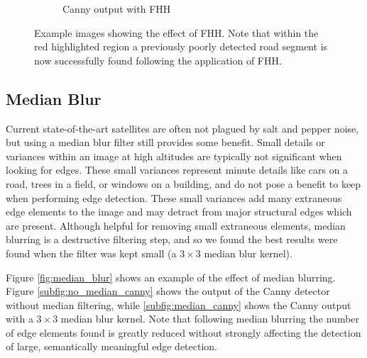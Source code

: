 \documentclass[conference]{IEEEtran}
\begin{document}
\begin{figure}
\begin{subfigure}[b]{0.48\linewidth}
        \caption{Canny output with FHH \label{subfig:fhh_b}}
    \end{subfigure}
\caption{Example images showing the effect of FHH. Note that within the red highlighted region a previously poorly detected road segment is now successfully found following the application of FHH.}
\label{fig:fhh}
\end{figure}

\subsection{Median Blur}

Current state-of-the-art satellites are often not plagued by salt and pepper noise, but using a median blur filter still provides some benefit. Small details or variances within an image at high altitudes are typically not significant when looking for edges. These small variances represent minute details like cars on a road, trees in a field, or windows on a building, and do not pose a benefit to keep when performing edge detection. These small variances add many extraneous edge elements to the image and may detract from major structural edges which are present. Although helpful for removing small extraneous elements, median blurring is a destructive filtering step, and so we found the best results were found when the filter was kept small (a $3\times3$ median blur kernel). 

Figure \ref{fig:median_blur} shows an example of the effect of median blurring. Figure \ref{subfig:no_median_canny} shows the output of the Canny detector without median filtering, while \ref{subfig:median_canny} shows the Canny output with a $3\times3$ median blur kernel. Note that following median blurring the number of edge elements found is greatly reduced without strongly affecting the detection of large, semantically meaningful edge detection.
\end{document}
